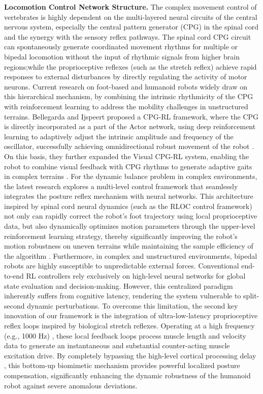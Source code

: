 \documentclass[lettersize,journal]{IEEEtran}
\begin{document}
\textbf{Locomotion Control Network Structure.}
The complex movement control of vertebrates is highly dependent on the multi-layered neural circuits of the central nervous system, especially the central pattern generator (CPG) in the spinal cord and the synergy with the sensory reflex pathways.
The spinal cord CPG circuit can spontaneously generate coordinated movement rhythms for multiple or bipedal locomotion without the input of rhythmic signals from higher brain regions;while the proprioceptive reflexes (such as the stretch reflex) achieve rapid responses to external disturbances by directly regulating the activity of motor neurons. 
Current research on foot-based and humanoid robots widely draw on this hierarchical mechanism, by combining the intrinsic rhythmicity of the CPG with reinforcement learning to address the mobility challenges in unstructured terrains. 
Bellegarda and Ijspeert proposed a CPG-RL framework, where the CPG is directly incorporated as a part of the Actor network, using deep reinforcement learning to adaptively adjust the intrinsic amplitude and frequency of the oscillator, successfully achieving omnidirectional robust movement of the robot \cite{bellegarda2022cpg}. 
On this basis, they further expanded the Visual CPG-RL system, enabling the robot to combine visual feedback with CPG rhythms to generate adaptive gaits in complex terrains \cite{bellegarda2024visual}. 
For the dynamic balance problem in complex environments, the latest research explores a multi-level control framework that seamlessly integrates the posture reflex mechanism with neural networks. 
This architecture inspired by spinal cord neural dynamics (such as the RLOC control framework) not only can rapidly correct the robot's foot trajectory using local proprioceptive data, but also dynamically optimizes motion parameters through the upper-level reinforcement learning strategy, thereby significantly improving the robot's motion robustness on uneven terrains while maintaining the sample efficiency of the algorithm \cite{gangapurwala2022rloc}. 
Furthermore, in complex and unstructured environments, bipedal robots are highly susceptible to unpredictable external forces. 
Conventional end-to-end RL controllers rely exclusively on high-level neural networks for global state evaluation and decision-making. 
However, this centralized paradigm inherently suffers from cognitive latency, rendering the system vulnerable to split-second dynamic perturbations. 
To overcome this limitation, the second key innovation of our framework is the integration of ultra-low-latency proprioceptive reflex loops inspired by biological stretch reflexes. 
Operating at a high frequency (e.g., 1000 Hz) , these local feedback loops process muscle length and velocity data to generate an instantaneous and substantial counter-acting muscle excitation drive. 
By completely bypassing the high-level cortical processing delay , this bottom-up biomimetic mechanism provides powerful localized posture compensation, significantly enhancing the dynamic robustness of the humanoid robot against severe anomalous deviations.
\end{document}
